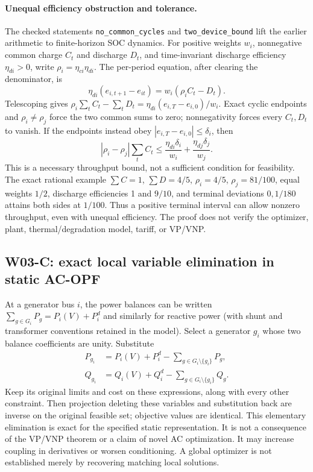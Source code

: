 \documentclass[11pt,letterpaper]{article}
\begin{document}
\paragraph{Unequal efficiency obstruction and tolerance.} The checked statements \texttt{no\_common\_cycles} and \texttt{two\_device\_bound} lift the earlier arithmetic to finite-horizon SOC dynamics. For positive weights $w_i$, nonnegative common charge $C_t$ and discharge $D_t$, and time-invariant discharge efficiency $\eta_{di}>0$, write $\rho_i=\eta_{ci}\eta_{di}$. The per-period equation, after clearing the denominator, is
\[
 \eta_{di}(e_{i,t+1}-e_{it})=w_i(\rho_i C_t-D_t).
\]
Telescoping gives $\rho_i\sum_t C_t-\sum_t D_t=\eta_{di}(e_{i,T}-e_{i,0})/w_i$. Exact cyclic endpoints and $\rho_i\ne\rho_j$ force the two common sums to zero; nonnegativity forces every $C_t,D_t$ to vanish. If the endpoints instead obey $|e_{i,T}-e_{i,0}|\le\delta_i$, then
\begin{equation}
 |\rho_i-\rho_j|\sum_t C_t\le \frac{\eta_{di}\delta_i}{w_i}+\frac{\eta_{dj}\delta_j}{w_j}.
 \label{eq:w03tolerance}
\end{equation}
This is a necessary throughput bound, not a sufficient condition for feasibility. The exact rational example $\sum C=1$, $\sum D=4/5$, $\rho_i=4/5$, $\rho_j=81/100$, equal weights $1/2$, discharge efficiencies 1 and $9/10$, and terminal deviations $0,1/180$ attains both sides at $1/100$. Thus a positive terminal interval can allow nonzero throughput, even with unequal efficiency. The proof does not verify the optimizer, plant, thermal/degradation model, tariff, or VP/VNP.

\subsection{W03-C: exact local variable elimination in static AC-OPF}
At a generator bus $i$, the power balances can be written $\sum_{g\in G_i}P_g=P_i(V)+P_i^d$ and similarly for reactive power (with shunt and transformer conventions retained in the model). Select a generator $g_i$ whose two balance coefficients are unity. Substitute
\begin{align*}
 P_{g_i}&=P_i(V)+P_i^d-\sum_{g\in G_i\setminus\{g_i\}}P_g,\\
 Q_{g_i}&=Q_i(V)+Q_i^d-\sum_{g\in G_i\setminus\{g_i\}}Q_g.
\end{align*}
Keep its original limits and cost on these expressions, along with every other constraint. Then projection deleting these variables and substitution back are inverse on the original feasible set; objective values are identical. This elementary elimination is exact for the specified static representation. It is not a consequence of the VP/VNP theorem or a claim of novel AC optimization. It may increase coupling in derivatives or worsen conditioning. A global optimizer is not established merely by recovering matching local solutions.
\end{document}
